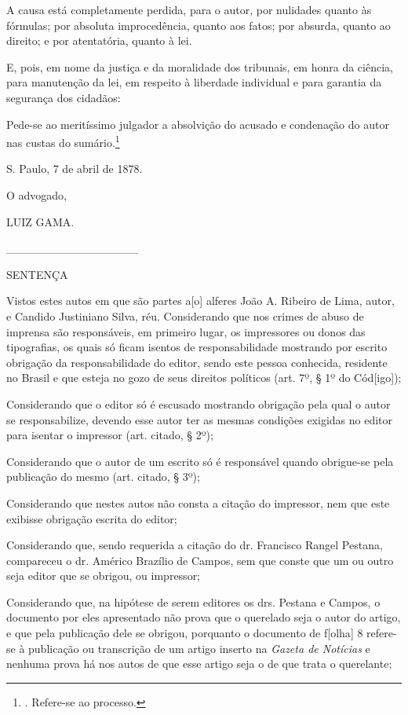 A causa está completamente perdida, para o autor, por nulidades quanto
às fórmulas; por absoluta improcedência, quanto aos fatos; por absurda,
quanto ao direito; e por atentatória, quanto à lei.

E, pois, em nome da justiça e da moralidade dos tribunais, em honra da
ciência, para manutenção da lei, em respeito à liberdade individual e
para garantia da segurança dos cidadãos:

Pede-se ao meritíssimo julgador a absolvição do acusado e condenação do
autor nas custas do sumário.\footnote{. Refere-se ao processo.}

S. Paulo, 7 de abril de 1878.

O advogado,

LUIZ GAMA.

\_\_\_\_\_\_\_\_\_\_\_\_\_\_\_\_

SENTENÇA

Vistos estes autos em que são partes a{[}o{]} alferes João A. Ribeiro de
Lima, autor, e Candido Justiniano Silva, réu. Considerando que nos
crimes de abuso de imprensa são responsáveis, em primeiro lugar, os
impressores ou donos das tipografias, os quais só ficam isentos de
responsabilidade mostrando por escrito obrigação da responsabilidade do
editor, sendo este pessoa conhecida, residente no Brasil e que esteja no
gozo de seus direitos políticos (art. 7º, § 1º do Cód{[}igo{]});

Considerando que o editor só é escusado mostrando obrigação pela qual o
autor se responsabilize, devendo esse autor ter as mesmas condições
exigidas no editor para isentar o impressor (art. citado, § 2º);

Considerando que o autor de um escrito só é responsável quando
obrigue-se pela publicação do mesmo (art. citado, § 3º);

Considerando que nestes autos não consta a citação do impressor, nem que
este exibisse obrigação escrita do editor;

Considerando que, sendo requerida a citação do dr. Francisco Rangel
Pestana, compareceu o dr. Américo Brazílio de Campos, sem que conste que
um ou outro seja editor que se obrigou, ou impressor;

Considerando que, na hipótese de serem editores os drs. Pestana e
Campos, o documento por eles apresentado não prova que o querelado seja
o autor do artigo, e que pela publicação dele se obrigou, porquanto o
documento de f{[}olha{]} 8 refere-se à publicação ou transcrição de um
artigo inserto na \emph{Gazeta de Notícias} e nenhuma prova há nos autos
de que esse artigo seja o de que trata o querelante;

